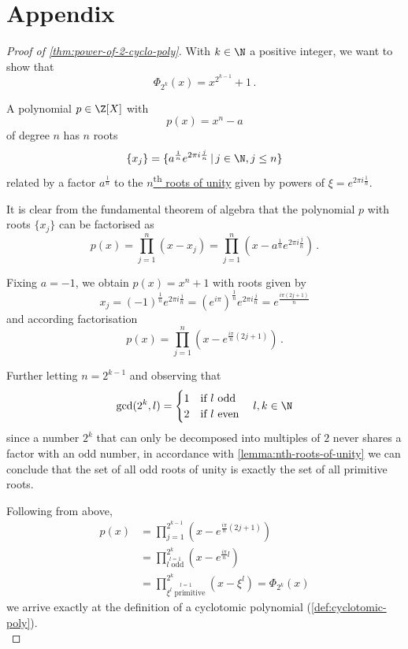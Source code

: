 \chapter*{Appendix}
\label{chap:appendix}

\begin{proof}[Proof of \autoref{thm:power-of-2-cyclo-poly}]
  With $k \in \N$ a positive integer, we want to show that
  $$\Phi_{2^k} (x) = x^{2^{k-1}} + 1\,.$$

  A polynomial $p \in \Z[X]$ with $$p(x) = x^n - a$$ of degree $n$ has $n$ roots
  $$\{x_j\} = \{a^\frac{1}{n} e^{2\pi i \frac{j}{n}} \,|\, j \in \N, j \leq n\}$$
  related by a factor $a^\frac{1}{n}$ to the
  \hyperref[lemma:nth-roots-of-unity]{$n$\textsuperscript{th} roots of unity} given by powers of
  $\xi = e^{2\pi i \frac{1}{n}}$.

  It is clear from the fundamental theorem of algebra that the polynomial $p$ with roots $\{x_j\}$
  can be factorised as
  $$p(x) = \prod_{j=1}^{n} (x - x_j) = \prod_{j=1}^{n} (x - a^\frac{1}{n} e^{2\pi i \frac{j}{n}})\,.$$

  Fixing $a = -1$, we obtain $p(x) = x^n + 1$ with roots given by
  $$x_j = (-1)^\frac{1}{n} e^{2\pi i \frac{j}{n}}
    = (e^{i\pi})^\frac{1}{n} e^{2\pi i \frac{j}{n}}
    = e^{\frac{i\pi (2j + 1)}{n}}$$
  and according factorisation
  $$p(x) = \prod_{j=1}^{n} (x - e^{\frac{i\pi}{n} (2j + 1)})\,.$$

  Further letting $n = 2^{k-1}$ and observing that
  $$\gcd(2^k, l) = \begin{cases}
      1 & \text{if } l \text{ odd}  \\
      2 & \text{if } l \text{ even}
    \end{cases} \quad l, k \in \N$$
  since a number $2^k$ that can only be decomposed into multiples of $2$
  never shares a factor with an odd number, in accordance with \autoref{lemma:nth-roots-of-unity}
  we can conclude that the set of all odd roots of unity is exactly the set of all primitive roots.

  Following from above,
  \begin{align*}
    p(x) & = \prod_{j=1}^{2^{k-1}} (x - e^{\frac{i\pi}{n} (2j + 1)})                \\
         & = \prod_{\stackrel{l=1}{l \text{ odd}}}^{2^k} (x - e^{\frac{i\pi}{n} l}) \\
         & = \prod_{\stackrel{l=1}{\xi^l \text{ primitive}}}^{2^k} (x - \xi^l)
    = \Phi_{2^k}(x)
  \end{align*}
  we arrive exactly at the definition of a cyclotomic polynomial (\autoref{def:cyclotomic-poly}). \\
  \parencite{power-of-2-cyclo-poly}
\end{proof}

